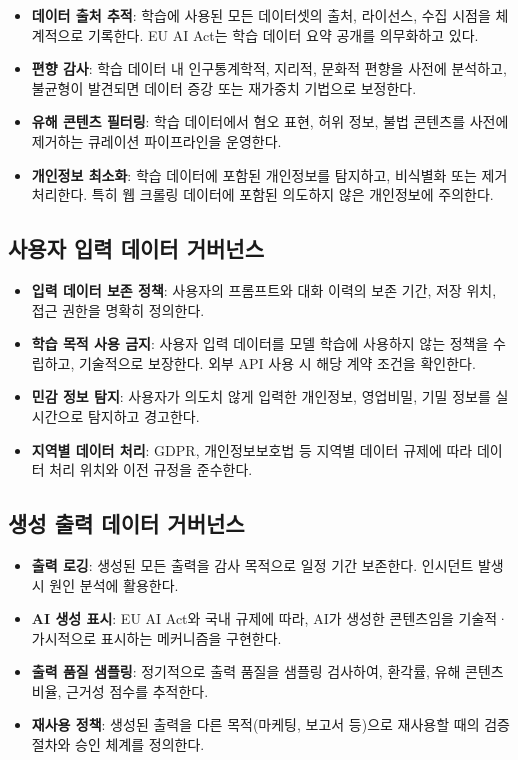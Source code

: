 \begin{itemize}
 \item \textbf{데이터 출처 추적}: 학습에 사용된 모든 데이터셋의 출처, 라이선스, 수집 시점을 체계적으로 기록한다. EU AI Act\cite{eu2024aiact}는 학습 데이터 요약 공개를 의무화하고 있다.
 \item \textbf{편향 감사}: 학습 데이터 내 인구통계학적, 지리적, 문화적 편향을 사전에 분석하고, 불균형이 발견되면 데이터 증강 또는 재가중치 기법으로 보정한다.
 \item \textbf{유해 콘텐츠 필터링}: 학습 데이터에서 혐오 표현, 허위 정보, 불법 콘텐츠를 사전에 제거하는 큐레이션 파이프라인을 운영한다.
 \item \textbf{개인정보 최소화}: 학습 데이터에 포함된 개인정보를 탐지하고, 비식별화 또는 제거 처리한다. 특히 웹 크롤링 데이터에 포함된 의도하지 않은 개인정보에 주의한다.
\end{itemize}

\subsection{사용자 입력 데이터 거버넌스}

\begin{itemize}
 \item \textbf{입력 데이터 보존 정책}: 사용자의 프롬프트와 대화 이력의 보존 기간, 저장 위치, 접근 권한을 명확히 정의한다.
 \item \textbf{학습 목적 사용 금지}: 사용자 입력 데이터를 모델 학습에 사용하지 않는 정책을 수립하고, 기술적으로 보장한다. 외부 API 사용 시 해당 계약 조건을 확인한다.
 \item \textbf{민감 정보 탐지}: 사용자가 의도치 않게 입력한 개인정보, 영업비밀, 기밀 정보를 실시간으로 탐지하고 경고한다.
 \item \textbf{지역별 데이터 처리}: GDPR, 개인정보보호법 등 지역별 데이터 규제에 따라 데이터 처리 위치와 이전 규정을 준수한다.
\end{itemize}

\subsection{생성 출력 데이터 거버넌스}

\begin{itemize}
 \item \textbf{출력 로깅}: 생성된 모든 출력을 감사 목적으로 일정 기간 보존한다. 인시던트 발생 시 원인 분석에 활용한다.
 \item \textbf{AI 생성 표시}: EU AI Act와 국내 규제에 따라, AI가 생성한 콘텐츠임을 기술적·가시적으로 표시하는 메커니즘을 구현한다.
 \item \textbf{출력 품질 샘플링}: 정기적으로 출력 품질을 샘플링 검사하여, 환각률, 유해 콘텐츠 비율, 근거성 점수를 추적한다.
 \item \textbf{재사용 정책}: 생성된 출력을 다른 목적(마케팅, 보고서 등)으로 재사용할 때의 검증 절차와 승인 체계를 정의한다.
\end{itemize}

